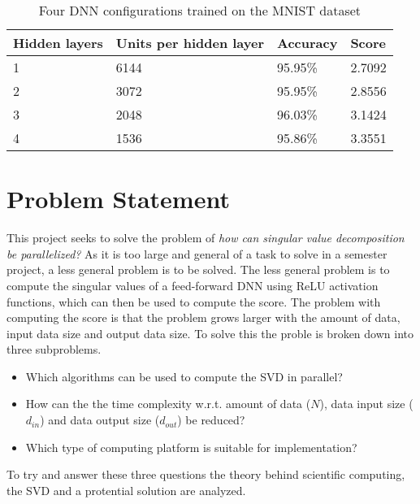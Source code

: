 \begin{table}[H]
  \centering
    \begin{tabular}{|l|l|l|l|} \hline
      Hidden layers & Units per hidden layer & Accuracy & Score \\ \hline
      1 & 6144 & 95.95\% & 2.7092 \\ \hline
      2 & 3072 & 95.95\% & 2.8556 \\ \hline
      3 & 2048 & 96.03\% & 3.1424 \\ \hline
      4 & 1536 & 95.86\% & 3.3551 \\ \hline
    \end{tabular}
    \caption{Four DNN configurations trained on the MNIST dataset}
    \label{tab:dnn:score}
\end{table}

\section{Problem Statement}

This project seeks to solve the problem of \textit{how can singular value decomposition be parallelized?} As it is too large and general of a task to solve in a semester project, a less general problem is to be solved. The less general problem is to compute the singular values of a feed-forward DNN using ReLU activation functions, which can then be used to compute the score. The problem with computing the score is that the problem grows larger with the amount of data, input data size and output data size. To solve this the proble  is broken down into three subproblems.

\begin{itemize}
\item Which algorithms can be used to compute the SVD in parallel?
\item How can the the time complexity w.r.t. amount of data ($N$), data input size ($d_{in}$) and data output size ($d_{out}$) be reduced?
\item Which type of computing platform is suitable for implementation?
\end{itemize}

\noindent To try and answer these three questions the theory behind scientific computing, the SVD and a protential solution are analyzed.
